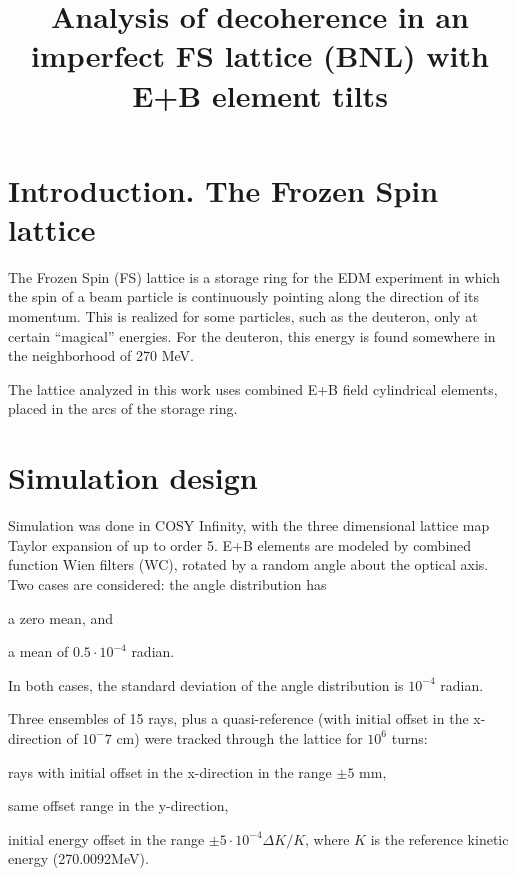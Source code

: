 \documentclass{article}
\newcommand{\Kmagic}{270.0092} %
\begin{document}
\title{Analysis of decoherence in an imperfect FS lattice (BNL) with E+B element tilts}
\maketitle

\section{Introduction. The Frozen Spin lattice}

The Frozen Spin (FS) lattice is a storage ring for the EDM experiment in which the spin of a beam particle is continuously pointing along the direction of its momentum. This is realized for some particles, such as the deuteron, only at certain ``magical'' energies. For the deuteron, this energy is found somewhere in the neighborhood of 270 MeV.

The lattice analyzed in this work uses combined E+B field cylindrical elements, placed in the arcs of the storage ring. 

\section{Simulation design}
Simulation was done in COSY Infinity, with the three dimensional lattice map Taylor expansion of up to order 5. E+B elements are modeled by combined function Wien filters (WC), rotated by a random angle about the optical axis. Two cases are considered: the angle distribution has 
\begin{inparaenum}[1)]
\item a zero mean, and
\item a mean of $0.5\cdot 10^{-4}$ radian.
\end{inparaenum}
In both cases, the standard deviation of the angle distribution is $10^{-4}$ radian.

Three ensembles of 15 rays, plus a quasi-reference (with initial offset in the x-direction of $10^-7$ cm) were tracked through the lattice for $10^6$ turns:
\begin{inparaenum}[1)]
\item rays with initial offset in the x-direction in the range $\pm 5$ mm,
\item same offset range in the y-direction,
\item initial energy offset in the range $\pm 5\cdot 10^{-4} \Delta K/K$, where $K$ is the reference kinetic energy (\Kmagic MeV).
\end{inparaenum}
\end{document}
